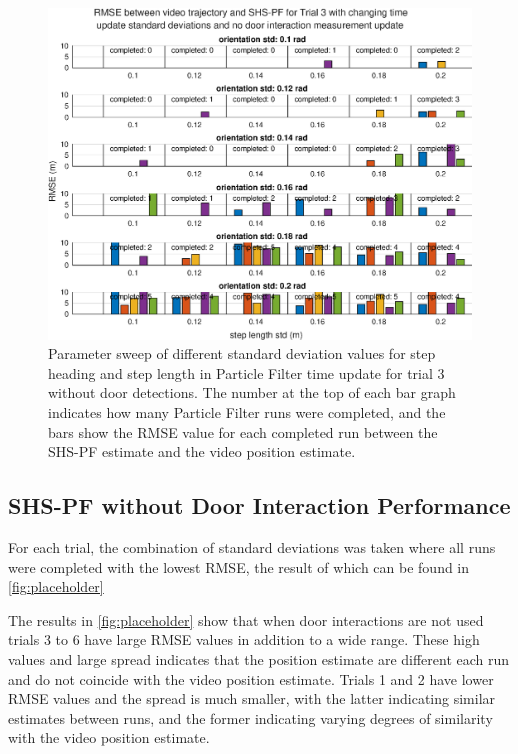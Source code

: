 \begin{figure}[H]
	\centering
	\includegraphics[width=0.8\linewidth]{"images/20201202_1344_orientation_std:_0_2_rad"}
	\setlength{\belowcaptionskip}{-15pt}
	\caption{Parameter sweep of different standard deviation values for step heading and step length in Particle Filter time update for trial 3 without door detections. The number at the top of each bar graph indicates how many Particle Filter runs were completed, and the bars show the RMSE value for each completed run between the SHS-PF estimate and the video position estimate. }
	\label{fig:rmsebetweenvideotrajectoryandshs-pffortrialnodetections31}
\end{figure}

\subsection{SHS-PF without Door Interaction Performance}

For each trial, the combination of standard deviations was taken where all runs were completed with the lowest RMSE, the result of which can be found in \cref{fig:placeholder}

The results in \cref{fig:placeholder} show that when door interactions are not used trials 3 to 6 have large RMSE values in addition to a wide range. These high values and large spread indicates that the position estimate are different each run and do not coincide with the video position estimate. Trials 1 and 2 have lower RMSE values and the spread is much smaller, with the latter indicating similar estimates between runs, and the former indicating varying degrees of similarity with the video position estimate.\par 

